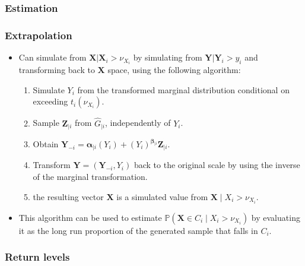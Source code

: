 \documentclass{article}
\numberwithin{equation}{section}
\begin{document}
\subsubsection{Estimation} \label{subsubsec:estimation}

\subsubsection{Extrapolation} \label{subsubsec:extrapolation}

\begin{itemize}
  \item Can simulate from $\bm{X}|\bm{X}_i > \nu_{X_i}$ by simulating from $\bm{Y}|\bm{Y}_i > y_i$ and transforming back to $\bm{X}$ space, using the following algorithm:
    \begin{enumerate}
      \item Simulate $Y_i$ from the transformed marginal distribution conditional on exceeding $t_i(\nu_{X_i})$.
      \item Sample $\bm{Z}_{\mid i}$ from $\hat{G}_{\mid i}$, independently of $Y_i$. 
      \item Obtain $\bm{Y}_{-i} = \bm{\alpha}_{\mid i}(Y_i) + (Y_i)^{\bm{\beta}_{\mid i}}\bm{Z}_{\mid i}$.
      \item Transform $\bm{Y} = (\bm{Y}_{-i}, Y_i)$ back to the original scale by using the inverse of the marginal transformation. 
      \item the resulting vector $\bm{X}$ is a simulated value from $\bm{X} \mid X_i > \nu_{X_i}$.
    \end{enumerate}
  \item This algorithm can be used to estimate $\mathbb{P}(\bm{X} \in C_i \mid X_i > \nu_{X_i})$ by evaluating it as the long run proportion of the generated sample that falls in $C_i$. 
\end{itemize}

\subsubsection{Return levels} \label{subsubsec:ce_return_levels}
\end{document}
